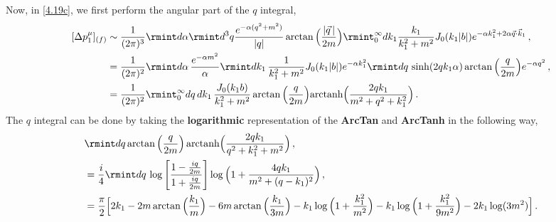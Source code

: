 Now, in \eqref{4.19c}, we first perform the angular part of the $q$ integral,
\begin{align}
    \begin{split}
         [\Delta p_1^{\mu}]_{(f)} &\sim \frac{1}{(2\pi)^3}\rmint d\alpha\rmint d^3q \frac{e^{-\alpha (q^2+m^2)}}{|q|}\arctan\Big(\frac{|\vec q\,|}{2m}\Big)\rmint_{0}^\infty dk_1\frac{k_1}{ k_1^2+m^2}J_{0}(k_1|b|)e^{-\alpha k_1^2+2\alpha \vec q\cdot \vec k_1}\,,\\ &
        =\frac{1}{(2\pi)^2}\rmint d\alpha \,\frac{e^{-\alpha m^2}}{\alpha}\rmint dk_1\,\frac{1}{ k_1^2+m^2}J_{0}(k_1|b|)e^{-\alpha k_1^2}\rmint dq\,\sinh(2q k_1 \alpha)\arctan\Big(\frac{q}{2m}\Big)e^{-\alpha q^2}\,,\\ &
        =\frac{1}{(2\pi)^2}\rmint_0^\infty dq \,dk_1\,\frac{J_{0}(k_1 b)}{k_1^2+m^2}\arctan\Big(\frac{q}{2m}\Big)\textrm{arctanh}\Big(\frac{2qk_1}{m^2+q^2+k_1^2}\Big)\,.\label{4.21cc}
    \end{split}
\end{align}
The $q$ integral can be done by taking the \textbf{logarithmic} representation of the \textbf{ArcTan} and \textbf{ArcTanh} in the following way,
\begin{align}
    \begin{split}
       & \rmint dq \arctan\Big(\frac{q}{2m}\Big)\,\textrm{arctanh}\Big(\frac{2q k_1}{q^2+k_1^2+m^2}\Big)\,,\\ &
       =\frac{i}{4}\rmint dq\, \log\Bigg[\frac{1-\frac{iq}{2m}}{1+\frac{iq}{2m}}\Bigg]\log\Big(1+\frac{4q k_1}{m^2+(q-k_1)^2}\Big)\,,\\ &
       =\frac{\pi}{2}\Big[2k_1-2m\arctan\Big(\frac{k_1}{m}\Big)-6m\arctan\Big(\frac{k_1}{3m}\Big)-k_1\log\Big(1+\frac{k_1^2}{m^2}\Big)-k_1\log\Big(1+\frac{k_1^2}{9m^2}\Big)-2k_1 \log(3m^2)\Big]\,.\label{4.25j}
    \end{split}
\end{align}
